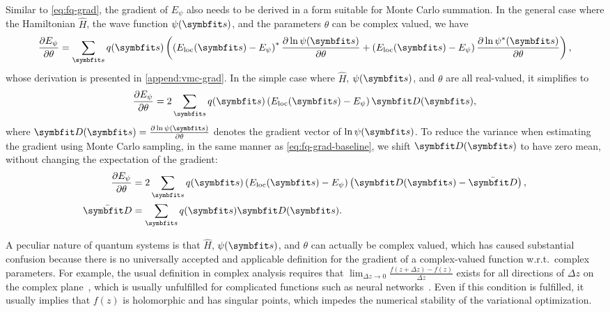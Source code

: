 Similar to \cref{eq:fq-grad}, the gradient of $E_\psi$ also needs to be derived in a form suitable for Monte Carlo summation. In the general case where the Hamiltonian $\hat{H}$, the wave function $\psi(\vs)$, and the parameters $\theta$ can be complex valued, we have
\begin{equation}
\frac{\partial E_\psi}{\partial \theta} = \sum_\vs q(\vs) \left( \left( E_\text{loc}(\vs) - E_\psi \right)^* \frac{\partial \ln \psi(\vs)}{\partial \theta} + \left( E_\text{loc}(\vs) - E_\psi \right) \frac{\partial \ln \psi^*(\vs)}{\partial \theta} \right), \label{eq:vmc-grad-cmpl}
\end{equation}
whose derivation is presented in \cref{append:vmc-grad}. In the simple case where $\hat{H}$, $\psi(\vs)$, and $\theta$ are all real-valued, it simplifies to
\begin{equation}
\frac{\partial E_\psi}{\partial \theta} = 2 \sum_\vs q(\vs) \left( E_\text{loc}(\vs) - E_\psi \right) \vD(\vs),
\label{eq:vmc-grad-real}
\end{equation}
where $\vD(\vs) = \frac{\partial \ln \psi(\vs)}{\partial \theta}$ denotes the gradient vector of $\ln \psi(\vs)$. To reduce the variance when estimating the gradient using Monte Carlo sampling, in the same manner as \cref{eq:fq-grad-baseline}, we shift $\vD(\vs)$ to have zero mean, without changing the expectation of the gradient:
\begin{align}
\frac{\partial E_\psi}{\partial \theta} &= 2 \sum_\vs q(\vs) \left( E_\text{loc}(\vs) - E_\psi \right) \left( \vD(\vs) - \bar{\vD} \right), \label{eq:vmc-grad-baseline} \\
\bar{\vD} &= \sum_\vs q(\vs) \vD(\vs).
\end{align}

A peculiar nature of quantum systems is that $\hat{H}$, $\psi(\vs)$, and $\theta$ can actually be complex valued, which has caused substantial confusion because there is no universally accepted and applicable definition for the gradient of a complex-valued function w.r.t.\ complex parameters. For example, the usual definition in complex analysis requires that $\lim_{\Delta z \to 0} \frac{f(z + \Delta z) - f(z)}{\Delta z}$ exists for all directions of $\Delta z$ on the complex plane~\cite{rudin1986real}, which is usually unfulfilled for complicated functions such as neural networks~\cite{bassey2021survey}. Even if this condition is fulfilled, it usually implies that $f(z)$ is holomorphic and has singular points, which impedes the numerical stability of the variational optimization.

